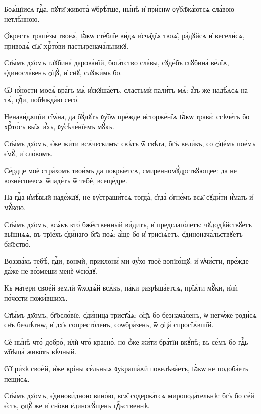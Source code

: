 \hKv Боѧ́щїисѧ гдⷭ҇а, пꙋти̑ живота̀ ѡ҆брѣ́тше, ны́нѣ и҆ при́снѡ  ᲂу҆бл҃жа́ютсѧ сла́вою нетлѣ́нною. 

\hKv Ѻ҆́крестъ трапе́зы твоеѧ̀, ꙗ҆́кѡ сте́блїе ви́дѧ и҆сча̑дїѧ  твоѧ̑, ра́дꙋйсѧ и҆ весели́сѧ, приводѧ̀ сїѧ̑ хрⷭ҇то́ви  пастыренача́льникꙋ. 
%

\hKv Ст҃ы́мъ дх҃омъ глꙋбина̀ дарова́нїй, бога́тство  сла́вы, сꙋде́бъ глꙋбина̀ ве́лїѧ, є҆диносла́венъ ѻ҆ц҃ꙋ̀, и҆  сн҃ꙋ, слꙋжи́мь бо. 
%

\hKv Ѿ ю҆́ности моеѧ̀ вра́гъ мѧ̀ и҆скꙋша́етъ,  сластьмѝ пали́тъ мѧ̀: а҆́зъ же надѣ́ѧсѧ на  тѧ̀, гдⷭ҇и, побѣжда́ю сего̀. 

\hKv Ненави́дѧщїи сїѡ́на, да бꙋ́дꙋтъ ᲂу҆́бѡ пре́жде и҆сторже́нїѧ  ꙗ҆́кѡ трава̀: ссѣче́тъ бо хрⷭ҇то́съ вы̑ѧ и҆́хъ,  ᲂу҆сѣче́нїемъ мꙋ́къ.  
%

\hKv Ст҃ы́мъ дх҃омъ, є҆́же жи́ти всѧ́чєскимъ: свѣ́тъ  ѿ свѣ́та, бг҃ъ вели́къ, со ѻ҆ц҃е́мъ пое́мъ є҆мꙋ̀, и҆  сло́вомъ. 
%

\hKv Се́рдце моѐ стра́хомъ твои́мъ да покры́етсѧ,  смиренномꙋ́дрствꙋющее: да не возне́сшеесѧ ѿпаде́тъ ѿ  тебѐ, всеще́дре.  

\hKv На гдⷭ҇а и҆мѣ́вый наде́ждꙋ, не ᲂу҆страши́тсѧ тогда̀,  є҆гда̀ ѻ҆гне́мъ всѧ̑ сꙋди́ти и҆́мать и҆ мꙋ́кою. 
%

\hKv Ст҃ы́мъ дх҃омъ, всѧ́къ кто̀ бж҃е́ственный ви́дитъ,  и҆ предглаго́летъ: чꙋдодѣ́йствꙋетъ вы̑шнѧѧ, въ трїе́хъ  є҆ди́наго  бг҃а поѧ̀: а҆́ще бо и҆  трисїѧ́етъ, є҆динонача́льствꙋетъ бж҃ество̀.  
%

\hKv Воззва́хъ тебѣ̀, гдⷭ҇и, вонмѝ, приклони́ ми ᲂу҆́хо твоѐ  вопїю́щꙋ: и҆ ѡ҆чи́сти, пре́жде да́же не во́змеши менѐ  ѿсю́дꙋ. 

\hKv Къ ма́тери свое́й землѝ ѿходѧ́й всѧ́къ, па́ки  разрѣша́етсѧ, прїѧ́ти мꙋ̑ки, и҆лѝ по́чєсти пожи́вшихъ. 
%

\hKv Ст҃ы́мъ дх҃омъ, бг҃осло́вїе, є҆ди́ница трист҃а́ѧ:  ѻ҆ц҃ъ бо безнача́ленъ, ѿ негѡ́же роди́сѧ сн҃ъ безлѣ́тнѡ,  и҆ дх҃ъ сопресто́ленъ, соѡбра́зенъ, ѿ ѻ҆ц҃а̀  спросїѧ́вшїй. 
%

\hKv Сѐ ны́нѣ что̀ добро̀, и҆лѝ что̀ красно̀, но є҆́же жи́ти  бра́тїи вкꙋ́пѣ; въ се́мъ бо гдⷭ҇ь ѡ҆бѣща̀ живо́тъ  вѣ́чный.  

\hKv Ѡ҆ ри́зѣ свое́й, и҆́же крі́ны сє́льныѧ ᲂу҆краша́ѧй  повелѣва́етъ, ꙗ҆́кѡ не подоба́етъ пещи́сѧ. 
%

\hKv Ст҃ы́мъ дх҃омъ, є҆динови́дною вино́ю, всѧ̑  содержа́тсѧ миропода́тельнѣ: бг҃ъ бо се́й є҆́сть, ѻ҆ц҃ꙋ̀  же и҆ сн҃ови є҆диносꙋ́щенъ гдⷭ҇ьственнѣ. 
%
